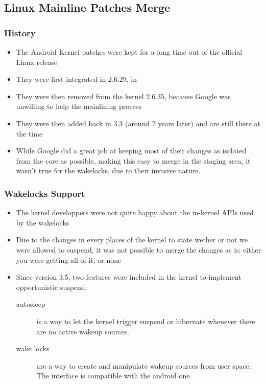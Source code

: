 \subsection{Linux Mainline Patches Merge}
\begin{frame}
  \frametitle{History}
  \begin{itemize}
  \item The Android Kernel patches were kept for a long time out of
    the official Linux release
  \item They were first integrated in 2.6.29, in
  \item They were then removed from the kernel 2.6.35, because Google
    was unwilling to help the mainlining process
  \item They were then added back in 3.3 (around 2 years later) and
    are still there at the time
  \item While Google did a great job at keeping most of their changes
    as isolated from the core as possible, making this easy to merge
    in the staging area, it wasn't true for the wakelocks, due to
    their invasive nature.
  \end{itemize}
\end{frame}

\begin{frame}
  \frametitle{Wakelocks Support}
  \begin{itemize}
  \item The kernel developpers were not quite happy about the
    in-kernel APIs used by the wakelocks
  \item Due to the changes in every places of the kernel to state
    wether or not we were allowed to suspend, it was not possible to
    merge the changes as is: either you were getting all of it, or
    none
  \item Since version 3.5, two features were included in the kernel to
    implement opportunistic suspend:
    \begin{description}
    \item[autosleep] is a way to let the kernel trigger suspend or
      hibernate whenever there are no active wakeup sources.
    \item[wake locks] are a way to create and manipulate wakeup
      sources from user space. The interface is compatible with the
      android one.
    \end{description}
  \end{itemize}
\end{frame}

